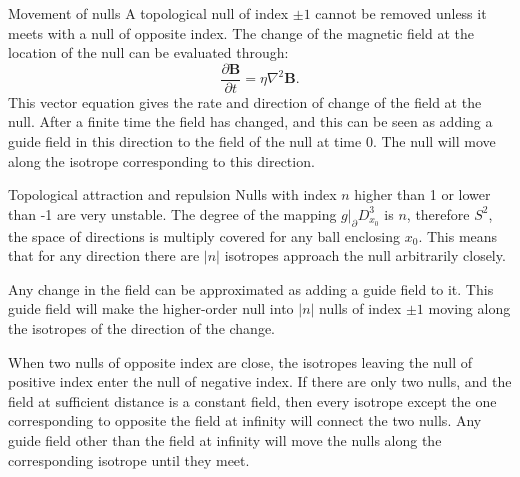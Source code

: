 \documentclass[final]{beamer}
\newlength{\onecolwid}
\newlength{\twocolwid}
\begin{document}
\begin{frame}[t]
\begin{columns}[t]
\begin{column}{\twocolwid}
\begin{columns}[t,totalwidth=\twocolwid]
\begin{column}{\onecolwid} %

\begin{block}{Movement of nulls}
    A topological null of index $\pm 1$ cannot be removed unless it meets with a null of opposite index. 
    The change of the magnetic field at the location of the null can be evaluated through:
    \begin{equation}
        \frac{\partial \mathbf{B}}{\partial t} = \eta \nabla^2 \mathbf{B}.
    \end{equation}
    This vector equation gives the rate and direction of change of the field at the null.
    After a finite time the field has changed, and this can be seen as adding a guide
    field in this direction to the field of the null at time 0. 
    The null will move along the isotrope corresponding to this direction.

\end{block}


\begin{block}{Topological attraction and repulsion}
    Nulls with index $n$ higher than 1 or lower than -1 are very unstable.  The degree of
    the mapping $g|_\partial D^3_{x_0}$ is $n$, therefore $S^2$, the space of
    directions is multiply covered for any ball enclosing $x_0$. 
    This means that for any direction there are $|n|$ isotropes approach the null arbitrarily
    closely. 

    Any change in the field can be approximated as 
    adding a guide field to it. 
    This guide field will make the higher-order null into $|n|$ nulls of index $\pm 1$ moving along the
    isotropes of the direction of the change. 

    When two nulls of opposite index are close, the isotropes leaving the null of positive
    index enter the null of negative index. 
    If there are only two nulls, and the field at sufficient distance is a constant field,
    then every isotrope except the one corresponding to opposite the field at infinity
    will connect the two nulls. 
    Any guide field other than the field at infinity will move the nulls along the
    corresponding isotrope until they meet. 
\end{block}



\end{column}
\end{columns}
\end{column}
\end{columns}
\end{frame}
\end{document}

